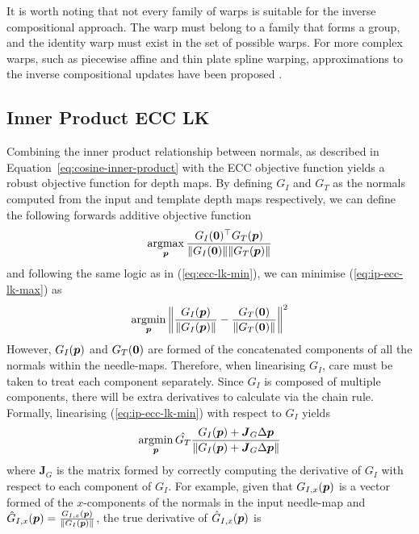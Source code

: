 It is worth noting that not every family of warps is suitable for the inverse compositional approach. The warp must belong to a family that forms a group, and the identity warp must exist in the set of possible warps. For more complex warps, such as piecewise affine and thin plate spline warping, approximations to the inverse compositional updates have been proposed \cite{RefWorks:227, RefWorks:277}.
\subsection{Inner Product ECC LK}\label{subsec:lk-inner-product}
Combining the inner product relationship between normals, as described in Equation~\ref{eq:cosine-inner-product} with the ECC objective function yields a robust objective function for depth maps. By defining $G_I$ and $G_T$ as the normals computed from the input and template depth maps respectively, we can define the following forwards additive objective function
\begin{equation}\label{eq:ip-ecc-lk-max}
   \argmax_{\p} \frac{G_I(\zero)^{\top} G_T(\p)}{\norm{G_I(\zero)} \norm{G_T(\p)}}
\end{equation}
and following the same logic as in (\ref{eq:ecc-lk-min}), we can minimise (\ref{eq:ip-ecc-lk-max}) as
\begin{equation}\label{eq:ip-ecc-lk-min}
   \argmin_{\p} \left \lVert \frac{G_I(\p)}{\norm{G_I(\p)}} - \frac{G_T(\zero)}{\norm{G_T(\zero)}} \right \rVert^2
\end{equation}
However, $G_I(\boldsymbol{p})$ and $G_T(\boldsymbol{0})$ are formed of the concatenated components of all the normals within the needle-maps. Therefore, when linearising $G_I$, care must be taken to treat each component separately. Since $G_I$ is composed of multiple components, there will be extra derivatives to calculate via the chain rule. Formally, linearising (\ref{eq:ip-ecc-lk-min}) with respect to $G_I$ yields
\begin{equation}\label{eq:ip-ecc-lk-linearised}
    \argmin_{\p} \hat{G_T} \frac{G_I(\p) + \boldsymbol{J}_G \Delta \p}{\norm{{G_I(\p) + \boldsymbol{J}_G \Delta \p}}}
\end{equation}
where $\boldsymbol{J}_G$ is the matrix formed by correctly computing the derivative of $G_I$ with respect to each component of $G_I$. For example, given that $G_{I,x}(\boldsymbol{p})$ is a vector formed of the $x$-components of the normals in the input needle-map and $\hat{G}_{I,x}(\boldsymbol{p}) = \frac{G_{I,x}(\boldsymbol{p})}{\lVert G_I(\boldsymbol{p}) \rVert}$, the true derivative of $\hat{G}_{I,x}(\boldsymbol{p})$ is

